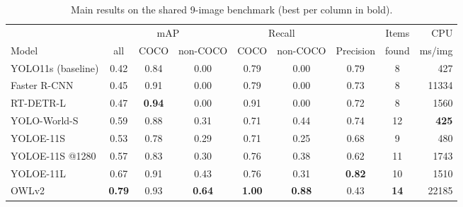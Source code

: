 \begin{table}[h]
\centering\small
\setlength{\tabcolsep}{4pt}
\caption{Main results on the shared 9-image benchmark (best per column in bold).}
\label{tab:main}
\begin{tabular}{@{}l ccc cc c c r@{}}
\toprule
 & \multicolumn{3}{c}{mAP} & \multicolumn{2}{c}{Recall} & & Items & CPU \\
\cmidrule(lr){2-4}\cmidrule(lr){5-6}
Model & all & COCO & non-COCO & COCO & non-COCO & Precision & found & ms/img \\
\midrule
YOLO11s (baseline) & 0.42 & 0.84 & 0.00 & 0.79 & 0.00 & 0.79 & 8 & 427 \\
Faster R-CNN & 0.45 & 0.91 & 0.00 & 0.79 & 0.00 & 0.73 & 8 & 11334 \\
RT-DETR-L & 0.47 & \textbf{0.94} & 0.00 & 0.91 & 0.00 & 0.72 & 8 & 1560 \\
\addlinespace
YOLO-World-S & 0.59 & 0.88 & 0.31 & 0.71 & 0.44 & 0.74 & 12 & \textbf{425} \\
YOLOE-11S & 0.53 & 0.78 & 0.29 & 0.71 & 0.25 & 0.68 & 9 & 480 \\
YOLOE-11S @1280 & 0.57 & 0.83 & 0.30 & 0.76 & 0.38 & 0.62 & 11 & 1743 \\
YOLOE-11L & 0.67 & 0.91 & 0.43 & 0.76 & 0.31 & \textbf{0.82} & 10 & 1510 \\
OWLv2 & \textbf{0.79} & 0.93 & \textbf{0.64} & \textbf{1.00} & \textbf{0.88} & 0.43 & \textbf{14} & 22185 \\
\bottomrule
\end{tabular}
\end{table}


